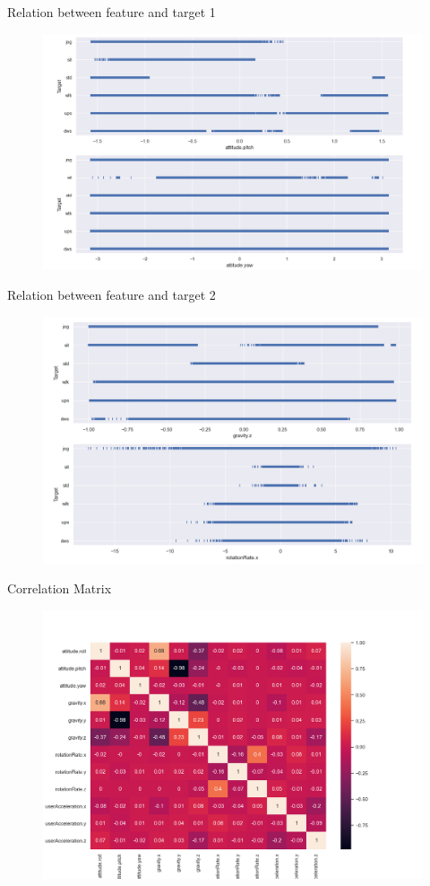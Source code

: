 \documentclass{beamer}
\begin{document}
\begin{frame}{Relation between feature and target 1}
\begin{figure}
	\centering
	\includegraphics[scale=0.3]{relations1.png}
	\label{fig:relations1}
\end{figure}
\end{frame}

\begin{frame}{Relation between feature and target 2}
\begin{figure}
	\centering
	\includegraphics[scale=0.3]{relations2.png}
	\label{fig:relations2}
\end{figure}
\end{frame}

\begin{frame}{Correlation Matrix}
\begin{figure}
	\centering
	\includegraphics[scale=0.3]{correlation_matrix.png}
	\label{fig:correlation_matrix}
\end{figure}
\end{frame}
\end{document}
